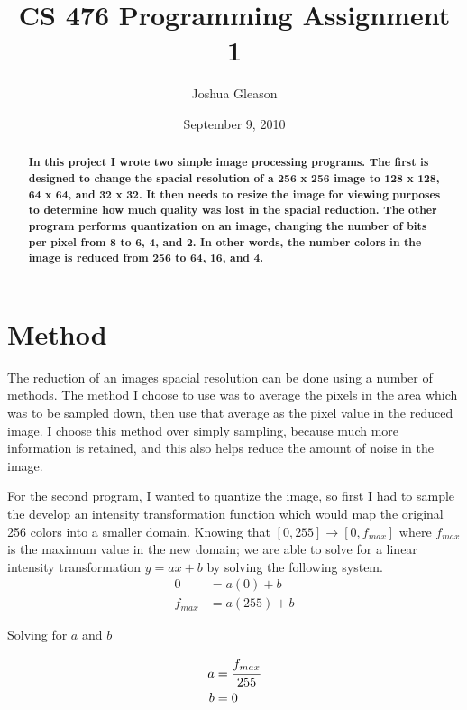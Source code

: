 \documentclass[12pt,a4paper,oneside]{article}
\begin{document}
\author{Joshua Gleason}
\title{CS 476 Programming Assignment 1}
\date{September 9, 2010}

\maketitle

\begin{abstract}
{ \bf
  In this project I wrote two simple image processing programs.  The first is designed
  to change the spacial resolution of a 256 x 256 image to 128 x 128, 64 x 64, and 32 x 32.
  It then needs to resize the image for viewing purposes to determine how much quality was
  lost in the spacial reduction.  The other program performs quantization on an image,
  changing the number of bits per pixel from 8 to 6, 4, and 2.  In other words, the number
  colors in the image is reduced from 256 to 64, 16, and 4.
}
\end{abstract}

\section{Method}
  The reduction of an images spacial resolution can be done using a number of methods.
  The method I choose to use was to average the pixels in the area which was to be
  sampled down, then use that average as the pixel value in the reduced image.  I choose
  this method over simply sampling, because much more information is retained, and this
  also helps reduce the amount of noise in the image.

  For the second program, I wanted to quantize the image, so first I had to sample the
  develop an intensity transformation function which would map the original 256 colors into
  a smaller domain.  Knowing that \( [0,255] \rightarrow [0,f_{max}] \) where $f_{max}$ is
  the maximum value in the new domain; we are able to solve for a linear intensity
  transformation $y=ax+b$ by solving the following system.
  \[
    \begin{split}
    0 & = a(0) + b \\
    f_{max} & = a(255) + b
    \end{split}
  \]

  Solving for $a$ and $b$

  \[
    \begin{split}
    a & = \cfrac{f_{max}}{255} \\
    b & = 0
    \end{split}
  \]
\end{document}
